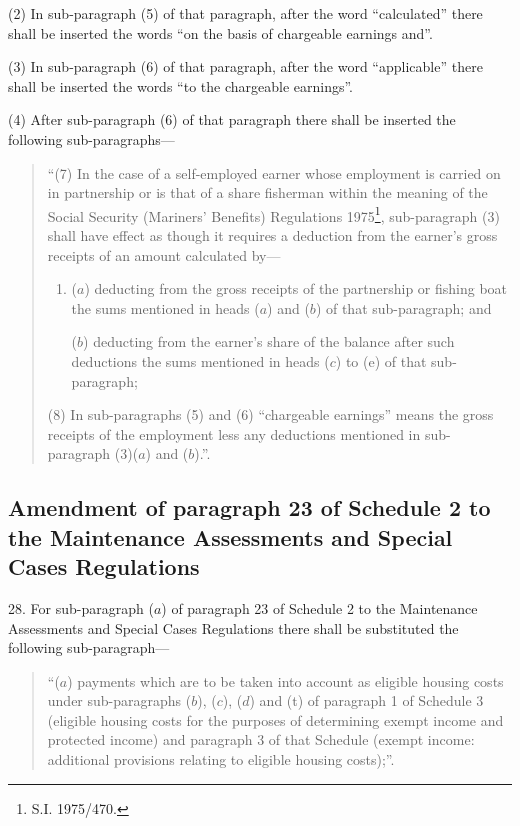\documentclass[a4paper]{article}
\begin{document}
(2) In sub-paragraph (5) of that paragraph, after the word “calculated” there shall be inserted the words “on the basis of chargeable earnings and”.

(3) In sub-paragraph (6) of that paragraph, after the word “applicable” there shall be inserted the words “to the chargeable earnings”.

(4) After sub-paragraph (6) of that paragraph there shall be inserted the following sub-paragraphs---
\begin{quotation}
“(7) In the case of a self-employed earner whose employment is carried on in partnership or is that of a share fisherman within the meaning of the Social Security (Mariners' Benefits) Regulations 1975\footnote{\frenchspacing  S.I. 1975/470.}, sub-paragraph (3) shall have effect as though it requires a deduction from the earner’s gross receipts of an amount calculated by---
\begin{enumerate}\item[]
($a$) deducting from the gross receipts of the partnership or fishing boat the sums mentioned in heads ($a$) and ($b$) of that sub-paragraph; and

($b$) deducting from the earner’s share of the balance after such deductions the sums mentioned in heads ($c$) to (e) of that sub-paragraph;
\end{enumerate}

(8) In sub-paragraphs (5) and (6) “chargeable earnings” means the gross receipts of the employment less any deductions mentioned in sub-paragraph (3)($a$) and ($b$).”.
\end{quotation}

\subsection[28. Amendment of paragraph 23 of Schedule 2 to the Maintenance Assessments and Special Cases Regulations]{Amendment of paragraph 23 of Schedule 2 to the Maintenance Assessments and Special Cases Regulations}

28.  For sub-paragraph ($a$) of paragraph 23 of Schedule 2 to the Maintenance Assessments and Special Cases Regulations there shall be substituted the following sub-paragraph---
\begin{quotation}
“($a$) payments which are to be taken into account as eligible housing costs under sub-paragraphs ($b$), ($c$), ($d$) and (t) of paragraph 1 of Schedule 3 (eligible housing costs for the purposes of determining exempt income and protected income) and paragraph 3 of that Schedule (exempt income: additional provisions relating to eligible housing costs);”.
\end{quotation}
\end{document}

